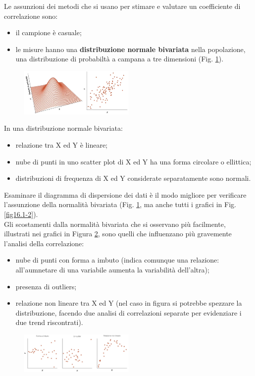 \documentclass[10pt, draft]{book}
\newcommand{\tightlist}{%
\setlength{\itemsep}{1pt}\setlength{\parskip}{0pt}\setlength{\parsep}{0pt}}
\begin{document}
Le assunzioni dei metodi che si usano per stimare e valutare un coefficiente di correlazione sono:
\begin{itemize}\tightlist
    \item il campione è casuale;
    \item le misure hanno una \textbf{distribuzione normale bivariata} nella popolazione, una distribuzione di probabiltà a campana a tre dimensioni (Fig. \ref{fig16.3-1}).
\end{itemize}
\begin{figure}[H]
    \centering
    \includegraphics[width=0.5\textwidth]{fig16.3-1}
    \caption{\small{}}
    \label{fig16.3-1}
\end{figure}

In una distribuzione normale bivariata:
    \begin{itemize}\tightlist
        \item relazione tra X ed Y è lineare;
        \item nube di punti in uno scatter plot di X ed Y ha una forma circolare o ellittica;
        \item distribuzioni di frequenza di X ed Y considerate separatamente sono normali.
    \end{itemize}

Esaminare il diagramma di dispersione dei dati è il modo migliore per verificare l'assunzione della normalità bivariata (Fig. \ref{fig16.3-1}, ma anche tutti i grafici in Fig. \ref{fig16.1-2}).\\
Gli scostamenti dalla normalità bivariata che si osservano più facilmente, illustrati nei grafici in Figura \ref{fig16.3-2}, sono quelli che influenzano più gravemente l'analisi della correlazione:
\begin{itemize}\tightlist
    \item nube di punti con forma a imbuto (indica comunque una relazione: all'aumnetare di una variabile aumenta la variabilità dell'altra);
    \item presenza di outliers;
    \item relazione non lineare tra X ed Y (nel caso in figura si potrebbe spezzare la distribuzione, facendo due analisi di correlazioni separate per evidenziare i due trend riscontrati).
\end{itemize}
\begin{figure}[H]
    \centering
    \includegraphics[width=0.5\textwidth]{fig16.3-2}
    \caption{\small{}}
    \label{fig16.3-2}
\end{figure}
\end{document}
